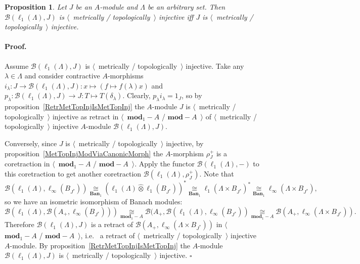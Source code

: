 \documentclass[12pt]{article}
\newcommand{\projtens}{\mathbin{\widehat{\otimes}}}
\newcommand{\isom}[1]{\mathop{\mathbin{\cong}}\limits_{#1}}
\newtheorem{proposition}[theorem]{Proposition}
\renewenvironment{proof}{\paragraph{Proof.}}{\hfill$\square$\medskip}
\begin{document}
\begin{proposition}\label{MapsFroml1toMetTopInj} Let $J$ be an $A$-module and
    $\Lambda$ be an arbitrary set. Then $\mathcal{B}(\ell_1(\Lambda),J)$ is
    $\langle$~metrically / topologically~$\rangle$ injective iff $J$ is
    $\langle$~metrically / topologically~$\rangle$ injective.
\end{proposition}
\begin{proof}
    Assume $\mathcal{B}(\ell_1(\Lambda), J)$ is $\langle$~metrically /
    topologically~$\rangle$ injective. Take any $\lambda\in\Lambda$ and consider
    contractive $A$-morphisms
    $i_\lambda:J\to\mathcal{B}(\ell_1(\Lambda),J):x\mapsto(f\mapsto
        f(\lambda)x)$ and $p_\lambda:\mathcal{B}(\ell_1(\Lambda),J)\to J:
        T\mapsto T(\delta_\lambda)$.
    Clearly, $p_\lambda i_\lambda=1_J$, so by
    proposition~\ref{RetrMetTopInjIsMetTopInj} the $A$-module $J$ is
    $\langle$~metrically / topologically~$\rangle$ injective as retract in
    $\langle$~$\mathbf{mod}_1-A$ / $\mathbf{mod}-A$~$\rangle$ of 
    $\langle$~metrically / topologically~$\rangle$ injective $A$-module
    $\mathcal{B}(\ell_1(\Lambda),J)$.

    Conversely, since $J$ is $\langle$~metrically / topologically~$\rangle$
    injective, by proposition~\ref{MetTopInjModViaCanonicMorph} the $A$-morphism
    $\rho_J^+$ is a coretraction in 
    $\langle$~$\mathbf{mod}_1-A$ / $\mathbf{mod}-A$~$\rangle$.
    Apply the functor $\mathcal{B}(\ell_1(\Lambda),-)$ to this coretraction to
    get another coretraction $\mathcal{B}(\ell_1(\Lambda),\rho_J^+)$. Note that
    $$
        \mathcal{B}(\ell_1(\Lambda),\ell_\infty(B_{J^*}))
        \isom{\mathbf{Ban}_1}
        {(\ell_1(\Lambda)\projtens \ell_1(B_{J^*}))}^*
        \isom{\mathbf{Ban}_1}
        {\ell_1(\Lambda\times B_{J^*})}^*
        \isom{\mathbf{Ban}_1}
        \ell_\infty(\Lambda\times B_{J^*}),
    $$
    so we have an isometric isomorphism of Banach modules:
    $$
        \mathcal{B}(\ell_1(\Lambda),\mathcal{B}(A_+,\ell_\infty(B_{J^*})))
        \isom{\mathbf{mod}_1-A}
        \mathcal{B}(A_+,\mathcal{B}(\ell_1(\Lambda),\ell_\infty(B_{J^*}))
        \isom{\mathbf{mod}_1-A}
        \mathcal{B}(A_+,\ell_\infty(\Lambda\times B_{J^*})).
    $$
    Therefore $\mathcal{B}(\ell_1(\Lambda),J)$ is a retract of
    $\mathcal{B}(A_+,\ell_\infty(\Lambda\times B_{J^*}))$ in
    $\langle$~$\mathbf{mod}_1-A$ / $\mathbf{mod}-A$~$\rangle$, i.e.
    \ a retract of $\langle$~metrically / topologically~$\rangle$ 
    injective $A$-module. By proposition~\ref{RetrMetTopInjIsMetTopInj} 
    the $A$-module $\mathcal{B}(\ell_1(\Lambda), J)$ is 
    $\langle$~metrically / topologically~$\rangle$ injective.
\end{proof}
\end{document}
